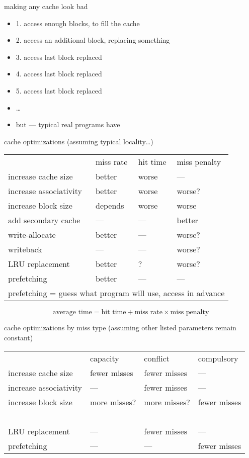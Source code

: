 \begin{frame}{making any cache look bad}
    \begin{itemize}
    \item 1. access enough blocks, to fill the cache
    \item 2. access an additional block, replacing something
    \item 3. access last block replaced
    \item 4. access last block replaced
    \item 5. access last block replaced
    \item \ldots
        \vspace{.5cm}
    \item but --- typical real programs have 
    \end{itemize}
\end{frame}

\begin{frame}{cache optimizations}
(assuming typical locality\ldots)
\newcommand{\good}{\textcolor{green!50!black}{better}}
\newcommand{\bad}{\textcolor{red!50!black}{worse}}
\begin{tabular}{llll}
~ & miss rate & hit time & miss penalty \\
increase cache size & \good & \bad & --- \\
increase associativity & \good & \bad & \bad? \\
increase block size & depends & \bad & \bad \\
add secondary cache & --- & --- & \good \\
write-allocate & \good & --- & \bad? \\
writeback & --- & --- & \bad? \\
LRU replacement & \good & ? & \bad? \\
prefetching & \good & --- & --- \\
\multicolumn{4}{l}{\small prefetching = guess what program will use, access in advance}
\end{tabular}
\[
\text{average time} = \text{hit time} + \text{miss rate} \times \text{miss penalty}
\]
\end{frame}

\begin{frame}{cache optimizations by miss type}
\newcommand{\good}{\textcolor{green!50!black}{fewer misses}}
\newcommand{\bad}{\textcolor{red!50!black}{more misses}}
(assuming other listed parameters remain constant)
\begin{tabular}{llll}
    ~ & capacity & conflict & compulsory \\
increase cache size & \good & \good & --- \\
increase associativity & --- & \good & --- \\
increase block size & \bad? & \bad? & \good \\
~ \\
LRU replacement & --- & \good & --- \\
prefetching & --- & --- & \good \\
\end{tabular}
\end{frame}

